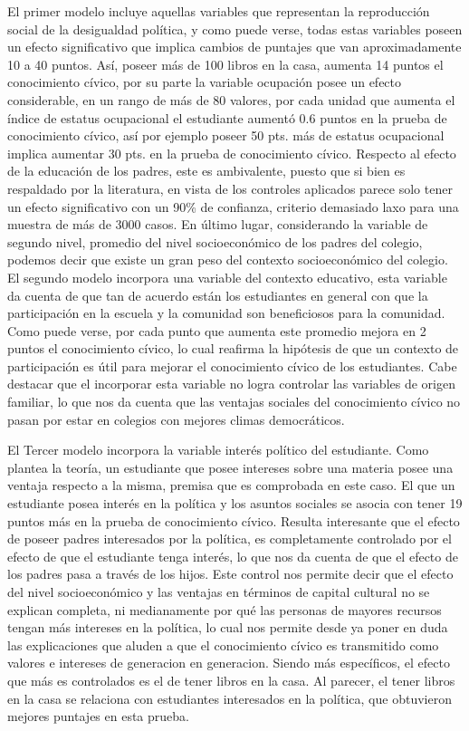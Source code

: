 \documentclass[
]{article}
\begin{document}
El primer modelo incluye aquellas variables que representan la
reproducción social de la desigualdad política, y como puede verse,
todas estas variables poseen un efecto significativo que implica cambios
de puntajes que van aproximadamente 10 a 40 puntos. Así, poseer más de
100 libros en la casa, aumenta 14 puntos el conocimiento cívico, por su
parte la variable ocupación posee un efecto considerable, en un rango de
más de 80 valores, por cada unidad que aumenta el índice de estatus
ocupacional el estudiante aumentó 0.6 puntos en la prueba de
conocimiento cívico, así por ejemplo poseer 50 pts. más de estatus
ocupacional implica aumentar 30 pts. en la prueba de conocimiento
cívico. Respecto al efecto de la educación de los padres, este es
ambivalente, puesto que si bien es respaldado por la literatura, en
vista de los controles aplicados parece solo tener un efecto
significativo con un 90\% de confianza, criterio demasiado laxo para una
muestra de más de 3000 casos. En último lugar, considerando la variable
de segundo nivel, promedio del nivel socioeconómico de los padres del
colegio, podemos decir que existe un gran peso del contexto
socioeconómico del colegio. El segundo modelo incorpora una variable del
contexto educativo, esta variable da cuenta de que tan de acuerdo están
los estudiantes en general con que la participación en la escuela y la
comunidad son beneficiosos para la comunidad. Como puede verse, por cada
punto que aumenta este promedio mejora en 2 puntos el conocimiento
cívico, lo cual reafirma la hipótesis de que un contexto de
participación es útil para mejorar el conocimiento cívico de los
estudiantes. Cabe destacar que el incorporar esta variable no logra
controlar las variables de origen familiar, lo que nos da cuenta que las
ventajas sociales del conocimiento cívico no pasan por estar en colegios
con mejores climas democráticos.

El Tercer modelo incorpora la variable interés político del estudiante.
Como plantea la teoría, un estudiante que posee intereses sobre una
materia posee una ventaja respecto a la misma, premisa que es comprobada
en este caso. El que un estudiante posea interés en la política y los
asuntos sociales se asocia con tener 19 puntos más en la prueba de
conocimiento cívico. Resulta interesante que el efecto de poseer padres
interesados por la política, es completamente controlado por el efecto
de que el estudiante tenga interés, lo que nos da cuenta de que el
efecto de los padres pasa a través de los hijos. Este control nos
permite decir que el efecto del nivel socioeconómico y las ventajas en
términos de capital cultural no se explican completa, ni medianamente
por qué las personas de mayores recursos tengan más intereses en la
política, lo cual nos permite desde ya poner en duda las explicaciones
que aluden a que el conocimiento cívico es transmitido como valores e
intereses de generacion en generacion. Siendo más específicos, el efecto
que más es controlados es el de tener libros en la casa. Al parecer, el
tener libros en la casa se relaciona con estudiantes interesados en la
política, que obtuvieron mejores puntajes en esta prueba.
\end{document}
